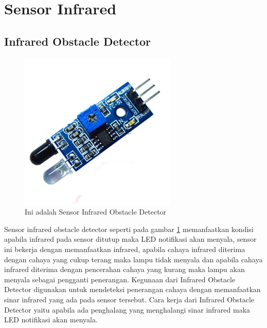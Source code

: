 \section{Sensor Infrared}
\subsection{Infrared Obstacle Detector}
\begin{figure}[!htbp]
  \centering
  \includegraphics[width=.75\textwidth]{figures/Arduino/sensorinfrared.png}
  \caption{Ini adalah Sensor Infrared Obstacle Detector}\label{fig:obstacle}
\end{figure}
Sensor infrared obstacle detector seperti pada gambar \ref{fig:obstacle} memanfaatkan kondisi apabila infrared pada sensor ditutup maka LED notifikasi akan menyala, sensor ini bekerja dengan memanfaatkan infrared, apabila cahaya infrared diterima dengan cahaya yang cukup terang maka lampu tidak menyala dan apabila cahaya infrared diterima dengan pencerahan cahaya yang kurang maka lampu akan menyala sebagai pengganti penerangan. Kegunaan dari Infrared Obstacle Detector digunakan untuk mendeteksi penerangan cahaya dengan memanfaatkan sinar infrared yang ada pada sensor tersebut. Cara kerja dari Infrared Obstacle Detector yaitu apabila ada penghalang yang menghalangi sinar infrared maka LED notifikasi akan menyala.


